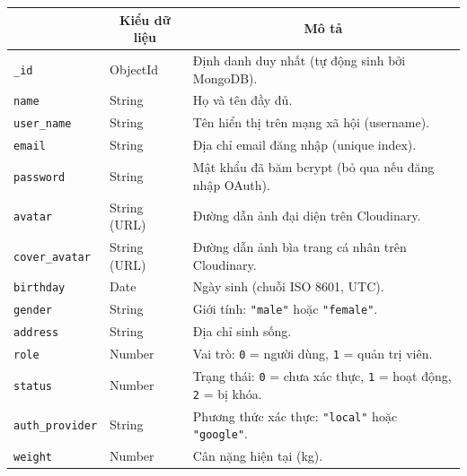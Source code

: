 \begin{table}[H]
\centering
\footnotesize
\setlength{\tabcolsep}{5pt}
\renewcommand{\arraystretch}{1.15}
\begin{tabularx}{\textwidth}{|p{4.0cm}|p{2.6cm}|X|}
\hline
\rowcolor{dbheadblue}
\multicolumn{1}{|c|}{\color{white}\textbf{Trường}} &
\multicolumn{1}{c|}{\color{white}\textbf{Kiểu dữ liệu}} &
\multicolumn{1}{c|}{\color{white}\textbf{Mô tả}} \\
\hline
\texttt{\_id}                  & ObjectId          & Định danh duy nhất (tự động sinh bởi MongoDB). \\ \hline
\rowcolor{dbrowalt}
\texttt{name}                  & String            & Họ và tên đầy đủ. \\ \hline
\texttt{user\_name}            & String            & Tên hiển thị trên mạng xã hội (username). \\ \hline
\rowcolor{dbrowalt}
\texttt{email}                 & String            & Địa chỉ email đăng nhập (unique index). \\ \hline
\texttt{password}              & String            & Mật khẩu đã băm bcrypt (bỏ qua nếu đăng nhập OAuth). \\ \hline
\rowcolor{dbrowalt}
\texttt{avatar}                & String (URL)      & Đường dẫn ảnh đại diện trên Cloudinary. \\ \hline
\texttt{cover\_avatar}         & String (URL)      & Đường dẫn ảnh bìa trang cá nhân trên Cloudinary. \\ \hline
\rowcolor{dbrowalt}
\texttt{birthday}              & Date              & Ngày sinh (chuỗi ISO 8601, UTC). \\ \hline
\texttt{gender}                & String            & Giới tính: \texttt{"male"} hoặc \texttt{"female"}. \\ \hline
\rowcolor{dbrowalt}
\texttt{address}               & String            & Địa chỉ sinh sống. \\ \hline
\texttt{role}                  & Number            & Vai trò: \texttt{0} = người dùng, \texttt{1} = quản trị viên. \\ \hline
\rowcolor{dbrowalt}
\texttt{status}                & Number            & Trạng thái: \texttt{0} = chưa xác thực, \texttt{1} = hoạt động, \texttt{2} = bị khóa. \\ \hline
\texttt{auth\_provider}        & String            & Phương thức xác thực: \texttt{"local"} hoặc \texttt{"google"}. \\ \hline
\rowcolor{dbrowalt}
\texttt{weight}                & Number            & Cân nặng hiện tại (kg). \\ \hline

\end{tabularx}
\end{table}
